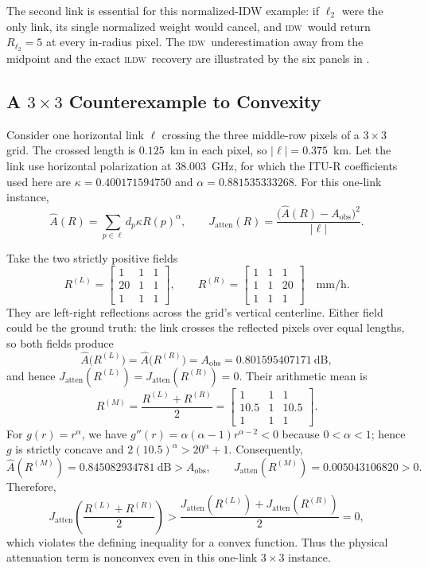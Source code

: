 \documentclass[a4paper,fleqn]{cas-sc}
\DeclareRobustCommand{\IDW}{\textsc{idw}}
\DeclareRobustCommand{\ILDW}{\textsc{ildw}}
\begin{document}
The second link is essential for this normalized-IDW example: if $\ell_2$ were
the only link, its single normalized weight would cancel, and \IDW\ would
return $R_{\ell_2}=5$ at every in-radius pixel.
The \IDW\ underestimation away from the midpoint and the exact \ILDW\ recovery
are illustrated by the six panels in .

\clearpage
\vspace*{2em}

\subsection{A $3\times3$ Counterexample to Convexity}
\label{appendix:nonconvexity-example}
Consider one horizontal link $\ell$ crossing the three middle-row pixels of a
$3\times3$ grid.  The crossed length is $0.125$~km in each pixel, so
$|\ell|=0.375$~km.  Let the link use horizontal polarization at
$38.003$~GHz, for which the ITU-R coefficients used here are
$\kappa=0.400171594750$ and $\alpha=0.881535333268$.  For this one-link
instance,
\[
\widehat A(R)=\sum_{p\in\ell}d_p\kappa R(p)^\alpha,
\qquad
J_{\mathrm{atten}}(R)=
\frac{\bigl(\widehat A(R)-A_{\mathrm{obs}}\bigr)^2}{|\ell|}.
\]

Take the two strictly positive fields
\[
R^{(L)}=\begin{bmatrix}1&1&1\\20&1&1\\1&1&1\end{bmatrix},
\qquad
R^{(R)}=\begin{bmatrix}1&1&1\\1&1&20\\1&1&1\end{bmatrix}
\quad \si{\milli\meter\per\hour}.
\]
They are left-right reflections across the grid's vertical centerline.  Either
field could be the ground truth: the link crosses the reflected pixels over
equal lengths, so both fields produce
\[
\widehat A\bigl(R^{(L)}\bigr)=\widehat A\bigl(R^{(R)}\bigr)
=A_{\mathrm{obs}}=0.801595407171\ \si{\deci\bel},
\]
and hence
$J_{\mathrm{atten}}(R^{(L)})=J_{\mathrm{atten}}(R^{(R)})=0$.
Their arithmetic mean is
\[
R^{(M)}=\frac{R^{(L)}+R^{(R)}}{2}
=\begin{bmatrix}1&1&1\\10.5&1&10.5\\1&1&1\end{bmatrix}.
\]
For $g(r)=r^\alpha$, we have
$g''(r)=\alpha(\alpha-1)r^{\alpha-2}<0$ because $0<\alpha<1$; hence $g$ is
strictly concave and
$2(10.5)^\alpha>20^\alpha+1$.  Consequently,
\[
\widehat A(R^{(M)})=0.845082934781\ \si{\deci\bel}>A_{\mathrm{obs}},
\qquad
J_{\mathrm{atten}}(R^{(M)})=0.005043106820>0.
\]
Therefore,
\[
J_{\mathrm{atten}}\!\left(\frac{R^{(L)}+R^{(R)}}{2}\right)
>
\frac{J_{\mathrm{atten}}(R^{(L)})+J_{\mathrm{atten}}(R^{(R)})}{2}=0,
\]
which violates the defining inequality for a convex function.  Thus the
physical attenuation term is nonconvex even in this one-link $3\times3$
instance.
\end{document}
